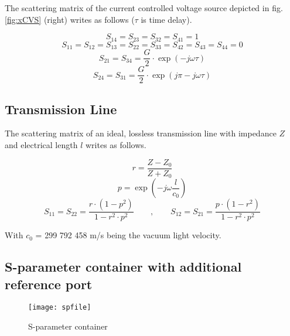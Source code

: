 The scattering matrix of the current controlled voltage source
depicted in fig. \ref{fig:xCVS} (right) writes as follows ($\tau$ is
time delay).

\begin{equation}
S_{14} = S_{23} = S_{32} = S_{41} = 1
\end{equation}
\begin{equation}
S_{11} = S_{12} = S_{13} = S_{22} = S_{33} = S_{42} = S_{43} = S_{44} = 0
\end{equation}
\begin{equation}
S_{21} = S_{34} = \frac{G}{2}\cdot \exp\left(-j\omega\tau\right)
\end{equation}
\begin{equation}
S_{24} = S_{31} = \frac{G}{2}\cdot \exp\left(j\pi-j\omega\tau\right)
\end{equation}

\subsection{Transmission Line}

The scattering matrix of an ideal, lossless transmission line with
impedance $Z$ and electrical length $l$ writes as follows.

\begin{equation}
r = \frac{Z-Z_0}{Z+Z_0}
\end{equation}
\begin{equation}
p = \exp\left(-j\omega\frac{l}{c_0}\right)
\end{equation}
\begin{equation}
S_{11} = S_{22} = \frac{r\cdot(1-p^2)}{1-r^2\cdot p^2} \qquad,\qquad
S_{12} = S_{21} = \frac{p\cdot(1-r^2)}{1-r^2\cdot p^2}
\end{equation}

With $c_0$ = 299 792 458 m/s being the vacuum light velocity.

\subsection{S-parameter container with additional reference port}
\label{sec:spfile}

\begin{figure}[ht]
\begin{center}
\texttt{[image: spfile]}
\end{center}
\caption{S-parameter container}
\label{fig:spfile}
\end{figure}
\FloatBarrier

